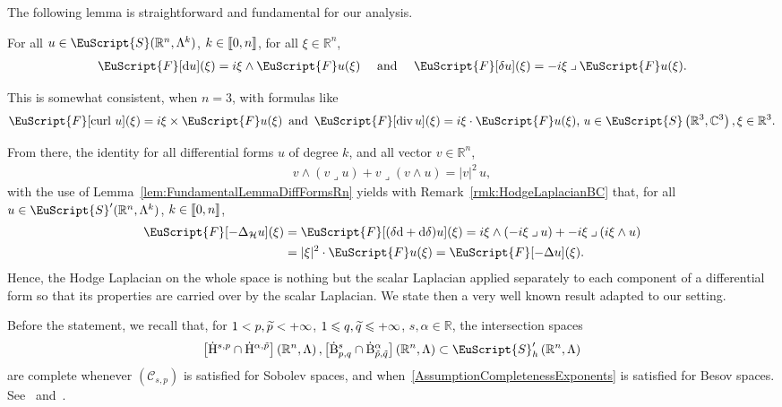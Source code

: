 \documentclass[AHL,Unicode,longabstracts,published]{cedram}
\renewcommand*{\div}{\mathrm{div\,}}
\DeclareMathOperator{\curl}{curl\,}
\newcommand{\bbR}{\mathbb{R}}
\newcommand{\bbC}{\mathbb{C}}
\newcommand{\rmH}{\mathrm{H}}%
\newcommand{\rmB}{\mathrm{B}}
\newcommand{\rmd}{\mathrm{d}}
\newcommand{\clH}{\mathcal{H}}
\newcommand{\clC}{\mathcal{C}}
\newcommand{\eus}{\EuScript}
\newcommand{\llbracket}{\mathopen{[\mkern -2.7mu[}}
\newcommand{\rrbracket}{\mathclose{]\mkern -2.7mu]}}
\newcommand{\llb}{\llbracket}
\newcommand{\rrb}{\rrbracket}
\newcommand{\iprod}{\mathbin{\lrcorner}}
\let\oldtilde\tilde
\renewcommand*{\tilde}[1]{\mathchoice{\widetilde{#1}}{\widetilde{#1}}{\oldtilde{#1}}{\oldtilde{#1}}}
\begin{document}
The following lemma is straightforward and fundamental for our analysis.

\begin{lemm}\label{lem:FundamentalLemmaDiffFormsRn}
For all $u\in\eus{S}(\bbR^n,\Lambda^k)$, $k\in\llb 0,n\rrb$, for all $\xi\in\bbR^n$,
\begin{align*}
\eus{F}[\rmd u](\xi)=i\xi\wedge \eus{F}u(\xi) \quad\text{ and }\quad \eus{F}[\delta u](\xi)=-i\xi\iprod \eus{F}u(\xi) .
\end{align*}
\end{lemm}

\begin{rema}
This is somewhat consistent, when $n=3$, with formulas like
\begin{align*}
\eus{F}[\curl u](\xi) = i\xi\times\eus{F}u(\xi)\,\text{ and }\,\eus{F}[\div u](\xi) = i\xi\cdot\eus{F}u(\xi)\text{, } u\in\eus{S}\left(\bbR^3,\bbC^3\right), \xi \in\bbR^3.
\end{align*}
\end{rema}

From there, the identity for all differential forms $u$ of degree $k$, and all vector $v\in\bbR^n$,
\begin{align*}
v\wedge(v\iprod u) + v\iprod(v\wedge u) = | v|^2 \, u,
\end{align*}
with the use of Lemma~\ref{lem:FundamentalLemmaDiffFormsRn} yields with Remark~\ref{rmk:HodgeLaplacianBC} that, for all $u\in\eus{S}'(\bbR^n,\Lambda^k)$, $k\in\llb 0,n\rrb$,
\begin{align*}
\eus{F}[-\Delta_{\clH} u](\xi)&=\eus{F}[(\delta\rmd + \rmd\delta) u](\xi) = i\xi\wedge(-i\xi\iprod u) + -i\xi\iprod(i\xi\wedge u)\\
&= | \xi|^2 \cdot \eus{F}u(\xi) = \eus{F}[-\Delta u](\xi).
\end{align*}
Hence, the Hodge Laplacian on the whole space is nothing but the scalar Laplacian applied separately to each component of a differential form so that its properties are carried over by the scalar Laplacian. We state then a very well known result adapted to our setting.

Before the statement, we recall that, for $1<p,\Tilde{p}<+\infty$, $1\leqslant q,\Tilde{q}\leqslant +\infty$, $s,\alpha\in\bbR$, the intersection spaces
\begin{align*}
\left[\dot{\rmH}^{s,p}\cap \dot{\rmH}^{\alpha,\tilde{p}}\right]\left(\bbR^n,\Lambda\right),\left[\dot{\rmB}^{s}_{p,q}\cap \dot{\rmB}^{\alpha}_{\tilde{p},\tilde{q}}\right]\left(\bbR^n,\Lambda\right) \subset \eus{S}'_h\left(\bbR^n,\Lambda\right)
\end{align*}
are complete whenever $(\clC_{s,p})$ is satisfied for Sobolev spaces, and when~\eqref{AssumptionCompletenessExponents} is satisfied for Besov spaces. See~\cite[Lemma~2.5]{Gaudin2022} and~\cite[Proposition~2.17]{bookBahouriCheminDanchin}.
\end{document}
